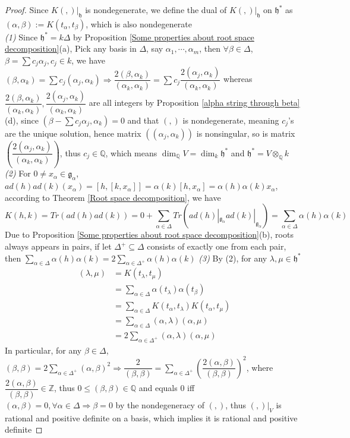 \documentclass[main]{subfiles}
\begin{document}
\begin{proof}
Since $K(,)|_{\mathfrak{h}}$ is nondegenerate, we define the dual of $K(,)|_{\mathfrak{h}}$ on $\mathfrak{h}^*$ as $(\alpha,\beta):=K(t_\alpha,t_\beta)$, which is also nondegenerate \\
\textit{(1) }Since $\mathfrak{h}^*=k\Delta$ by Proposition \ref{Some properties about root space decomposition}(a), Pick any basis in $\Delta$, say $\alpha_1,\cdots,\alpha_m$, then $\forall\beta\in\Delta$, $\beta=\sum c_j\alpha_j,c_j\in k$, we have $(\beta,\alpha_k)=\displaystyle\sum c_j(\alpha_j,\alpha_k)\Rightarrow \dfrac{2(\beta,\alpha_k)}{(\alpha_k,\alpha_k)}=\sum c_j\dfrac{2(\alpha_j,\alpha_k)}{(\alpha_k,\alpha_k)}$ whereas $\dfrac{2(\beta,\alpha_k)}{(\alpha_k,\alpha_k)},\dfrac{2(\alpha_j,\alpha_k)}{(\alpha_k,\alpha_k)}$ are all integers by Proposition \ref{alpha string through beta}(d), since $\left(\beta-\sum c_j\alpha_j,\alpha_k\right)=0$ and that $(,)$ is nondegenerate, meaning $c_j$'s are the unique solution, hence matrix $\left((\alpha_j,\alpha_k)\right)$ is nonsingular, so is matrix $\left(\dfrac{2(\alpha_j,\alpha_k)}{(\alpha_k,\alpha_k)}\right)$, thus $c_j\in\mathbb Q$, which means $\dim_{\mathbb Q}V=\dim_{k}\mathfrak{h}^*$ and $\mathfrak{h}^*=V\otimes_\mathbb{Q}k$ \\
\textit{(2) }For $0\neq x_\alpha\in\mathfrak{g}_\alpha$, $ad(h)ad(k)(x_\alpha)=[h,[k,x_\alpha]]=\alpha(k)[h,x_\alpha]=\alpha(h)\alpha(k)x_\alpha$, according to Theorem \ref{Root space decomposition}, we have $$K(h,k)=Tr(ad(h)ad(k))=0+\displaystyle\sum_{\alpha\in\Delta}Tr\left(ad(h)|_{\mathfrak{g}_\alpha}ad(k)|_{\mathfrak{g}_\alpha}\right)=\sum_{\alpha\in\Delta}\alpha(h)\alpha(k)$$Due to Proposition \ref{Some properties about root space decomposition}(b), roots always appears in pairs, if let $\Delta^+\subseteq\Delta$ consists of exactly one from each pair, then $\displaystyle\sum_{\alpha\in\Delta}\alpha(h)\alpha(k)=2\sum_{\alpha\in\Delta^+}\alpha(h)\alpha(k)$
\textit{(3) }By (2), for any $\lambda,\mu\in\mathfrak{h}^*$\begin{align*}
(\lambda,\mu)&=K(t_\lambda,t_\mu)\\ &=\displaystyle\sum_{\alpha\in\Delta}\alpha(t_\lambda)\alpha(t_\beta)\\ &=\sum_{\alpha\in\Delta}K(t_\alpha,t_\lambda)K(t_\alpha,t_\mu)\\ &=\sum_{\alpha\in\Delta}(\alpha,\lambda)(\alpha,\mu)\\ &=2\sum_{\alpha\in\Delta^+}(\alpha,\lambda)(\alpha,\mu)
\end{align*}In particular, for any $\beta\in \Delta$, $(\beta,\beta)=\displaystyle2\sum_{\alpha\in\Delta^+}(\alpha,\beta)^2\Rightarrow\dfrac{2}{(\beta,\beta)}=\sum_{\alpha\in\Delta^+}\left(\dfrac{2(\alpha,\beta)}{(\beta,\beta)}\right)^2$, where $\dfrac{2(\alpha,\beta)}{(\beta,\beta)}\in\mathbb Z$, thus $0\leq(\beta,\beta)\in\mathbb{Q}$ and equals $0$ iff $(\alpha,\beta)=0,\forall\alpha\in\Delta\Rightarrow\beta=0$ by the nondegeneracy of $(,)$, thus $(,)|_V$ is rational and positive definite on a basis, which implies it is rational and positive definite
\end{proof}
\end{document}
